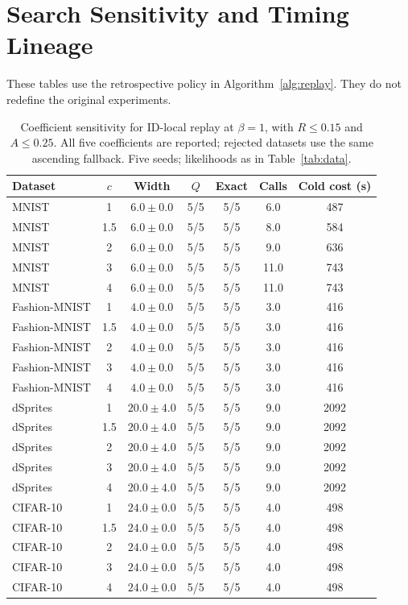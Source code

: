 \documentclass[make,article,submit,pdftex,moreauthors]{Definitions/mdpi}
\begin{document}
\section{Search Sensitivity and Timing Lineage}\label{app:search}
These tables use the retrospective policy in Algorithm~\ref{alg:replay}.
They do not redefine the original experiments.
\begin{table}[H]
\caption{Coefficient sensitivity for ID-local replay at $\beta=1$, with $R\le0.15$ and $A\le0.25$. All five coefficients are reported; rejected datasets use the same ascending fallback. Five seeds; likelihoods as in Table~\ref{tab:data}.}\label{tab:coefficient}
\small
\setlength{\tabcolsep}{3pt}
\begin{tabular*}{\textwidth}{@{\extracolsep{\fill}}lcccccc@{}}
\toprule
Dataset & $c$ & Width & $Q$ & Exact & Calls & Cold cost (s) \\
\midrule
MNIST & 1 & $6.0 \pm 0.0$ & 5/5 & 5/5 & 6.0 & 487 \\
MNIST & 1.5 & $6.0 \pm 0.0$ & 5/5 & 5/5 & 8.0 & 584 \\
MNIST & 2 & $6.0 \pm 0.0$ & 5/5 & 5/5 & 9.0 & 636 \\
MNIST & 3 & $6.0 \pm 0.0$ & 5/5 & 5/5 & 11.0 & 743 \\
MNIST & 4 & $6.0 \pm 0.0$ & 5/5 & 5/5 & 11.0 & 743 \\
Fashion-MNIST & 1 & $4.0 \pm 0.0$ & 5/5 & 5/5 & 3.0 & 416 \\
Fashion-MNIST & 1.5 & $4.0 \pm 0.0$ & 5/5 & 5/5 & 3.0 & 416 \\
Fashion-MNIST & 2 & $4.0 \pm 0.0$ & 5/5 & 5/5 & 3.0 & 416 \\
Fashion-MNIST & 3 & $4.0 \pm 0.0$ & 5/5 & 5/5 & 3.0 & 416 \\
Fashion-MNIST & 4 & $4.0 \pm 0.0$ & 5/5 & 5/5 & 3.0 & 416 \\
dSprites & 1 & $20.0 \pm 4.0$ & 5/5 & 5/5 & 9.0 & 2092 \\
dSprites & 1.5 & $20.0 \pm 4.0$ & 5/5 & 5/5 & 9.0 & 2092 \\
dSprites & 2 & $20.0 \pm 4.0$ & 5/5 & 5/5 & 9.0 & 2092 \\
dSprites & 3 & $20.0 \pm 4.0$ & 5/5 & 5/5 & 9.0 & 2092 \\
dSprites & 4 & $20.0 \pm 4.0$ & 5/5 & 5/5 & 9.0 & 2092 \\
CIFAR-10 & 1 & $24.0 \pm 0.0$ & 5/5 & 5/5 & 4.0 & 498 \\
CIFAR-10 & 1.5 & $24.0 \pm 0.0$ & 5/5 & 5/5 & 4.0 & 498 \\
CIFAR-10 & 2 & $24.0 \pm 0.0$ & 5/5 & 5/5 & 4.0 & 498 \\
CIFAR-10 & 3 & $24.0 \pm 0.0$ & 5/5 & 5/5 & 4.0 & 498 \\
CIFAR-10 & 4 & $24.0 \pm 0.0$ & 5/5 & 5/5 & 4.0 & 498 \\
\bottomrule\end{tabular*}
\end{table}
\end{document}
